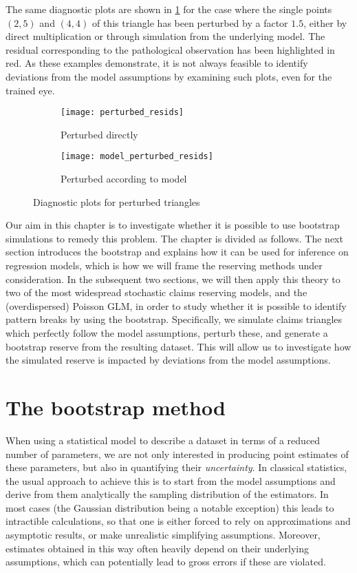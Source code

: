 \documentclass[a4paper]{book}
\begin{document}
The same diagnostic plots are shown in \cref{fig:diag-plot-perturbed} for the case where the single points $(2, 5)$ and $(4, 4)$ of this triangle has been perturbed by a factor $1.5$, either by direct multiplication or through simulation from the underlying model. The residual corresponding to the pathological observation has been highlighted in red. As these examples demonstrate, it is not always feasible to identify deviations from the model assumptions by examining such plots, even for the trained eye.

\begin{figure}[!htb]
  \centering
  \begin{subfigure}{\textwidth}
    \texttt{[image: perturbed\_resids]}
    \caption{Perturbed directly}
  \end{subfigure}
  \begin{subfigure}{\textwidth}
    \texttt{[image: model\_perturbed\_resids]}
    \caption{Perturbed according to model}
  \end{subfigure}
  \caption{Diagnostic plots for perturbed triangles}
  \label{fig:diag-plot-perturbed}
\end{figure}

Our aim in this chapter is to investigate whether it is possible to use bootstrap simulations to remedy this problem. The chapter is divided as follows. The next section introduces the bootstrap and explains how it can be used for inference on regression models, which is how we will frame the reserving methods under consideration. In the subsequent two sections, we will then apply this theory to two of the most widespread stochastic claims reserving models,  and the (overdispersed) Poisson GLM, in order to study whether it is possible to identify pattern breaks by using the bootstrap. Specifically, we simulate claims triangles which perfectly follow the model assumptions, perturb these, and generate a bootstrap reserve from the resulting dataset. This will allow us to investigate how the simulated reserve is impacted by deviations from the model assumptions.

\mainmatter%

\chapter{The bootstrap method} \label{chapter:boot}

When using a statistical model to describe a dataset in terms of a reduced number of parameters, we are not only interested in producing point estimates of these parameters, but also in quantifying their \emph{uncertainty}. In classical statistics, the usual approach to achieve this is to start from the model assumptions and derive from them analytically the sampling distribution of the estimators. In most cases (the Gaussian distribution being a notable exception) this leads to intractible calculations, so that one is either forced to rely on approximations and asymptotic results, or make unrealistic simplifying assumptions. Moreover, estimates obtained in this way often heavily depend on their underlying assumptions, which can potentially lead to gross errors if these are violated.
\end{document}

